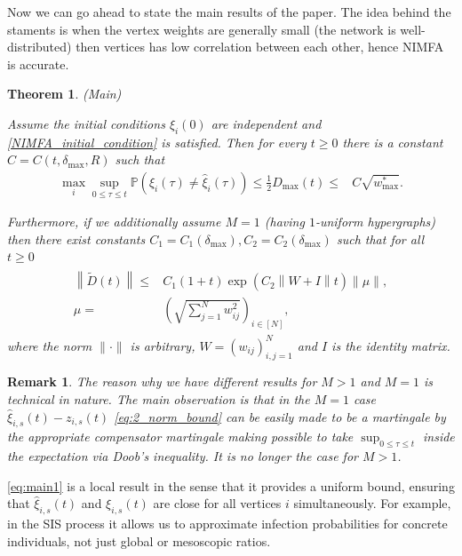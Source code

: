 \documentclass{article}
\newcommand{\pr}{\mathbb{P}}
\newcommand{\1}[1]{{\mathds{1}}_{\left\{#1\right\}}}
\newtheorem{theorem}{Theorem}
\newtheorem{remark}{Remark}
\newcommand{\rem}[1]{{#1}}
\newcommand{\remm}[1]{{#1}}
\begin{document}
	Now we can go ahead to state the main results of the paper. The idea behind the staments is when the vertex weights are generally small (the network is well-distributed) then vertices has low correlation between each other, hence NIMFA is accurate.
	\begin{theorem} (Main)
		\label{t:Main}
		
		Assume the initial conditions $\xi_{i}(0)$ are independent and \eqref{NIMFA_initial_condition} is satisfied. Then for every $t \geq 0$ there is a constant $C=C\left(t, \delta_{\max},R\right)$ such that
		\begin{align}
			\label{eq:main1}
		\max_{i}	\sup_{0 \leq \tau \leq t}\pr \left( \xi_{i}(\tau) \neq \hat{\xi}_{i}(\tau) \right) \leq 	\frac{1}{2}D_{\max}(t) \leq & C  \sqrt{\remm{w_{\max}^{*}}}.
		\end{align}
		
		Furthermore, if we additionally assume $M=1$ (having $1$-uniform hypergraphs) then there exist constants $C_1=C_1(\delta_{\max}), C_2=C_{2}(\delta_{\max})$ such that for all $t \geq 0$
		\begin{align}
			\label{eq:main2}
			\begin{split}
				\left \|\tilde{D}(t) \right \| \leq& C_1\remm{(1+t)}\exp\left(C_2\left\|W+I\right \|t \right) \|\mu \|,\\
				\mu=&\left( \sqrt{\sum_{j=1}^{N}w_{ij}^2}\right)_{i \in [N]},
			\end{split}
		\end{align}
		where the norm $\| \cdot \|$ is arbitrary, \rem{$W=\left(w_{ij}\right)_{i,j=1}^N$ and $I$ is the identity matrix}.
	\end{theorem}
	
	\begin{remark}The reason why we have different results for $M>1$ and $M=1$ is technical in nature. The main observation is that in the $M=1$ case $\hat{\xi}_{i,s}(t)-z_{i,s}(t)$ \ref{eq:2_norm_bound} \remm{can be easily made to be a martingale by the appropriate compensator} martingale making possible to take $\sup_{0 \leq \tau \leq t}$ inside the expectation via Doob's inequality. It is no longer the case for $M>1$.
	\end{remark}
	
\eqref{eq:main1} is a local result in the sense that it provides a uniform bound, ensuring that $\hat{\xi}_{i,s}(t)$ and $\xi_{i,s}(t)$ are close for all vertices $i$ simultaneously. For example, in the SIS process it allows us to approximate infection probabilities for concrete individuals, not just global or mesoscopic ratios. 
		
\end{document}
